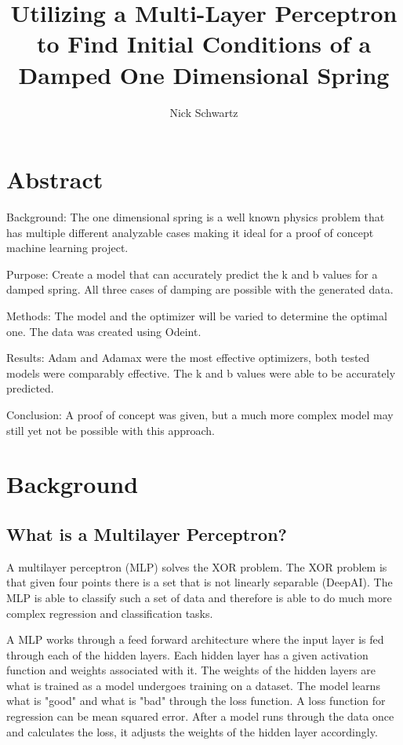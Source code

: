 \documentclass[12pt]{article}
\title{Utilizing a Multi-Layer Perceptron to Find Initial Conditions of a Damped One Dimensional Spring}
\author{Nick Schwartz}
\date{}
\begin{document}
	\maketitle
	\section*{Abstract}

	Background: The one dimensional spring is a well known physics problem that has multiple different analyzable cases making it ideal for a proof of concept machine learning project.

	Purpose: Create a model that can accurately predict the k and b values for a damped spring. All three cases of damping are possible with the generated data.

	Methods: The model and the optimizer will be varied to determine the optimal one. The data was created using Odeint.

	Results: Adam and Adamax were the most effective optimizers, both tested models were comparably effective. The k and b values were able to be accurately predicted.

	Conclusion: A proof of concept was given, but a much more complex model may still yet not be possible with this approach.

	\section*{Background}
	\subsection*{What is a Multilayer Perceptron?}
	A multilayer perceptron (MLP) solves the XOR problem. The XOR problem is that given four points there is a set that is not linearly separable (DeepAI). The MLP is able to classify such a set of data and therefore is able to do much more complex regression and classification tasks.
	
	A MLP works through a feed forward architecture where the input layer is fed through each of the hidden layers. Each hidden layer has a given activation function and weights associated with it. The weights of the hidden layers are what is trained as a model undergoes training on a dataset. The model learns what is "good" and what is "bad" through the loss function. A loss function for regression can be mean squared error. After a model runs through the data once and calculates the loss, it adjusts the weights of the hidden layer accordingly.
\end{document}
